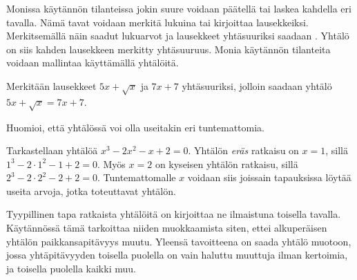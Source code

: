 Monissa käytännön tilanteissa jokin suure voidaan päätellä tai laskea kahdella eri tavalla. Nämä tavat voidaan merkitä lukuina tai kirjoittaa lausekkeiksi. Merkitsemällä näin saadut lukuarvot ja lausekkeet yhtäsuuriksi saadaan . Yhtälö on siis kahden lausekkeen merkitty yhtäsuuruus. Monia käytännön tilanteita voidaan mallintaa käyttämällä yhtälöitä.

\begin{esimerkki}
	Merkitään lausekkeet $5x+\sqrt{x}$ ja $7x+7$ yhtäsuuriksi, jolloin saadaan yhtälö $5x+\sqrt{x} = 7x+7$.
\end{esimerkki}


\begin{esimerkki}
	\begin{alakohdat}
	\end{alakohdat}
\end{esimerkki}



Huomioi, että yhtälössä voi olla useitakin eri tuntemattomia. 

\begin{esimerkki}
 Tarkastellaan yhtälöä $x^3-2x^2-x+2=0$. Yhtälön \textit{eräs} ratkaisu on $x=1$, sillä $1^3-2\cdot{1^2}-1+2=0$. 
 Myös $x=2$ on kyseisen yhtälön ratkaisu, sillä $2^3-2\cdot{2^2}-2+2=0$. 
 Tuntemattomalle $x$ voidaan siis joissain tapauksissa löytää useita arvoja, jotka toteuttavat yhtälön. 
\end{esimerkki}


Tyypillinen tapa ratkaista yhtälöitä on kirjoittaa ne ilmaistuna toisella tavalla.
Käytännössä tämä tarkoittaa niiden muokkaamista siten, ettei alkuperäisen yhtälön paikkansapitävyys muutu.
Yleensä tavoitteena on saada yhtälö muotoon, jossa yhtäpitävyyden toisella puolella on vain haluttu muuttuja ilman kertoimia, ja toisella puolella kaikki muu.

